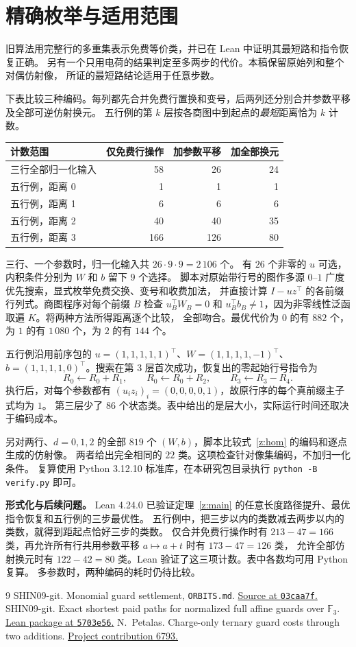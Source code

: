 \documentclass[UTF8,a4paper,11pt,scheme=plain]{ctexart}
\makeatletter
\theoremstyle{zh}
\theoremstyle{plain}
\newcommand{\F}{\mathbb F_3}
\newcommand{\fivewitness}{R_0\gets R_0+R_1,\qquad R_0\gets R_0+R_2,\qquad R_3\gets R_3-R_4.}
\newcommand{\counttable}[6]{%
  \begin{center}
  \begingroup\small\setlength{\tabcolsep}{8pt}\renewcommand{\arraystretch}{1.18}
  \begin{tabular}{@{}lrrr@{}}
  \hline
  #1 & #2 & #3 & #4\\ \hline
  #5 & 58 & 26 & 24\\
  #6 0 & 1 & 1 & 1\\
  #6 1 & 6 & 6 & 6\\
  #6 2 & 40 & 40 & 35\\
  #6 3 & 166 & 126 & 80\\ \hline
  \end{tabular}
  \endgroup
  \end{center}}
\newcommand{\sources}[1]{%
  \begin{thebibliography}{9}\small
  \bibitem{#1orbits}
  SHIN09-git. Monomial guard settlement, \texttt{ORBITS.md}.
  \href{https://github.com/SHIN09-git/integer-mult-bounds/blob/03caa7f6cb5bd21c834024e9d81f6b43eb325b91/research/monomial-guard-settlement/ORBITS.md}{Source at \texttt{03caa7f}.}
  \bibitem{#1lean}
  SHIN09-git. Exact shortest paid paths for normalized full affine guards over $\F$.
  \href{https://github.com/SHIN09-git/integer-mult-bounds/blob/5703e56d6eb4b4f0a83af8c23a5d1dddd0b5474f/research/monomial-guard-orbit-lean/README.md}{Lean package at \texttt{5703e56}.}
  \bibitem{#1charge}
  N.~Petalas. Charge-only ternary guard costs through two additions.
  \href{https://github.com/CrocSwap/integer-mult-bounds/pull/6793}{Project contribution 6793.}
  \end{thebibliography}}
\makeatother
\begin{document}
\newpage
\section{精确枚举与适用范围}
旧算法用完整行的多重集表示免费等价类，并已在 Lean 中证明其最短路和指令恢复正确\cite{zorbits,zlean}。
另有一个只用电荷的结果判定至多两步的代价\cite{zcharge}。本稿保留原始列和整个对偶仿射像，
所证的最短路结论适用于任意步数。

下表比较三种编码。每列都先合并免费行置换和变号，后两列还分别合并参数平移及全部可逆仿射换元。
五行例的第 $k$ 层按各商图中到起点的\emph{最短}距离恰为 $k$ 计数。
\counttable{计数范围}{仅免费行操作}{加参数平移}{加全部换元}{三行全部归一化输入}{五行例，距离 }

三行、一个参数时，归一化输入共 $26\cdot9\cdot9=2\,106$ 个。
有 $26$ 个非零的 $u$ 可选，内积条件分别为 $W$ 和 $b$ 留下 $9$ 个选择。
脚本对原始带行号的图作多源 $0$--$1$ 广度优先搜索，显式枚举免费交换、变号和收费加法，
并直接计算 $I-uz^\top$ 的各前缀行列式。商图程序对每个前缀 $B$ 检查
$u_B^\top W_B=0$ 和 $u_B^\top b_B\ne1$，因为非零线性泛函取遍 $K$。将两种方法所得距离逐个比较，
全部吻合。最优代价为 $0$ 的有 $882$ 个，为 $1$ 的有 $1\,080$ 个，为 $2$ 的有 $144$ 个。

五行例沿用前序包的 $u=(1,1,1,1,1)^\top$、$W=(1,1,1,1,-1)^\top$、
$b=(1,1,1,1,0)^\top$。搜索在第 3 层首次成功，恢复出的零起始行号指令为
\[
  \fivewitness
\]
执行后，对每个参数都有 $(u_i z_i)_i=(0,0,0,0,1)$，故原行序的每个真前缀主子式均为 $1$。
第三层少了 $86$ 个状态类。表中给出的是层大小，实际运行时间还取决于编码成本。

另对两行、$d=0,1,2$ 的全部 $819$ 个 $(W,b)$，脚本比较式~\eqref{z:hom} 的编码和逐点生成的仿射像。
两者给出完全相同的 $22$ 类。这项检查针对像集编码，不加归一化条件。
复算使用 Python 3.12.10 标准库，在本研究包目录执行 \texttt{python -B verify.py} 即可。

\medskip\noindent\textbf{形式化与后续问题。}
Lean 4.24.0 已验证定理~\ref{z:main} 的任意长度路径提升、最优指令恢复和五行例的三步最优性。
五行例中，把三步以内的类数减去两步以内的类数，就得到距起点恰好三步的类数。
仅合并免费行操作时有 $213-47=166$ 类，再允许所有行共用参数平移 $a\mapsto a+t$ 时有 $173-47=126$ 类，
允许全部仿射换元时有 $122-42=80$ 类。Lean 验证了这三项计数。表中各数均可用 Python 复算。
多参数时，两种编码的耗时仍待比较。
\sources{z}
\end{document}
